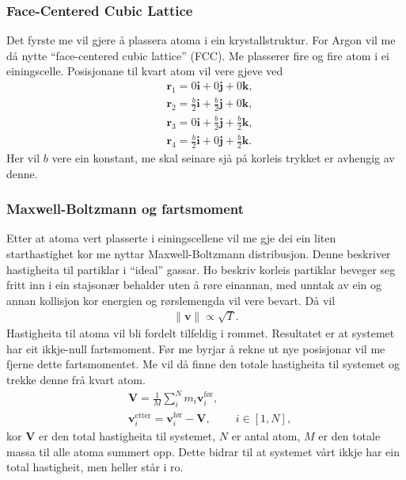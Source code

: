 \documentclass[12pt, a4paper]{article}
\theoremstyle{definition} \newtheorem*{definition}{Teorem}
\newcommand{\vb}{\mathbf}
\begin{document}
        \subsubsection*{Face-Centered Cubic Lattice}
            Det fyrste me vil gjere å plassera atoma i ein krystallstruktur. For Argon
            vil me då nytte ``face-centered cubic lattice'' (FCC). Me plasserer fire og fire atom i ei einingscelle. Posisjonane til kvart atom vil vere gjeve ved
            \begin{align*}
                &\vb{r}_1 = 0\vb{i} + 0\vb{j} + 0\vb{k}, \\
                &\vb{r}_2 = \frac{b}{2}\vb{i} + \frac{b}{2}\vb{j} + 0\vb{k}, \\
                &\vb{r}_3 = 0\vb{i} + \frac{b}{2}\vb{j} + \frac{b}{2}\vb{k}, \\
                &\vb{r}_4 = \frac{b}{2}\vb{i} + 0\vb{j} + \frac{b}{2}\vb{k}.
            \end{align*}
            Her vil $b$ vere ein konstant, me skal seinare sjå på korleis trykket er avhengig av denne. \\ %

        \subsubsection*{Maxwell-Boltzmann og fartsmoment}
            Etter at atoma vert plasserte i einingscellene vil me gje dei ein liten starthastighet kor me nyttar Maxwell-Boltzmann distribusjon. Denne beskriver 
            hastigheita til partiklar i ``ideal'' gassar. Ho beskriv korleis partiklar beveger seg fritt inn i ein stajsonær behalder uten å røre einannan, med unntak 
            av ein og annan kollisjon kor energien og rørslemengda vil vere bevart.
            Då vil
            \begin{align*}
                \|\vb{v}\| \propto \sqrt{T}.
            \end{align*}
            Hastigheita til atoma vil bli fordelt tilfeldig i rommet. Resultatet er at systemet har eit ikkje-null fartsmoment. Før me byrjar å rekne ut nye posisjonar vil
            me fjerne dette fartsmomentet. Me vil då finne den totale hastigheita til systemet og trekke denne frå kvart atom.
            \begin{align*}
                &\vb{V} = \frac{1}{M}\sum_i^N m_i\vb{v}_{i}^{\text{før}}, \\
                &\vb{v}_{i}^{\text{etter}} = \vb{v}_{i}^{\text{før}} - \vb{V}, \qquad \ i \in [1, N],
            \end{align*}
            kor $\vb{V}$ er den total hastigheita til systemet, $N$ er antal atom, $M$ er den totale massa til alle atoma summert opp. Dette bidrar til at systemet vårt
            ikkje har ein total hastigheit, men heller står i ro. \\
\end{document}
